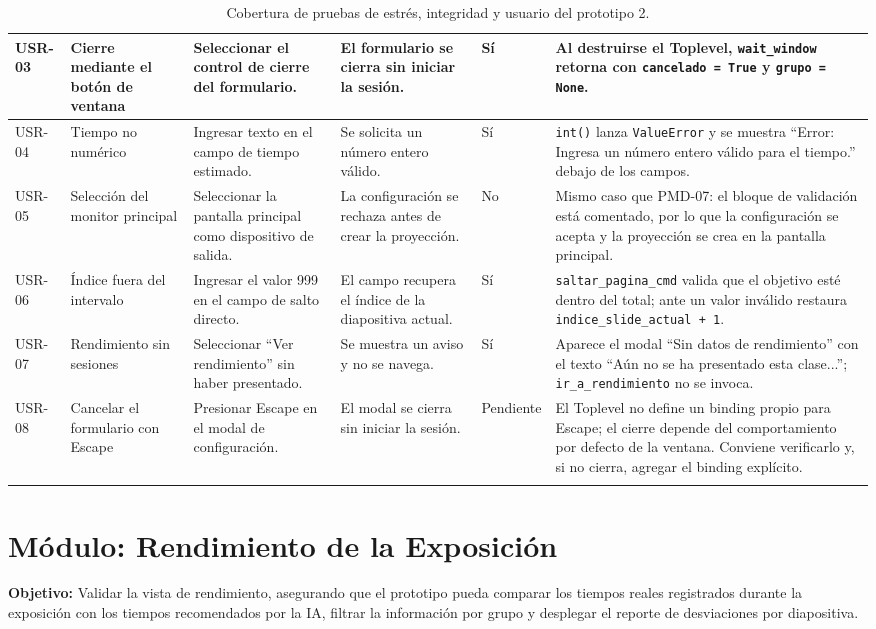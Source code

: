 \documentclass[12pt,letterpaper]{article}
\begin{document}
{\begin{longtable}{|L{1.1cm}|L{2.3cm}|L{3.2cm}|L{3.6cm}|L{1.2cm}|L{3.6cm}|}
USR-03 & Cierre mediante el botón de ventana & Seleccionar el control de cierre del formulario. & El formulario se cierra sin iniciar la sesión. & Sí & Al destruirse el Toplevel, \texttt{wait\_window} retorna con \texttt{cancelado = True} y \texttt{grupo = None}. \\ \hline
USR-04 & Tiempo no numérico & Ingresar texto en el campo de tiempo estimado. & Se solicita un número entero válido. & Sí & \texttt{int()} lanza \texttt{ValueError} y se muestra ``Error: Ingresa un número entero válido para el tiempo.'' debajo de los campos. \\ \hline
USR-05 & Selección del monitor principal & Seleccionar la pantalla principal como dispositivo de salida. & La configuración se rechaza antes de crear la proyección. & No & Mismo caso que PMD-07: el bloque de validación está comentado, por lo que la configuración se acepta y la proyección se crea en la pantalla principal. \\ \hline
USR-06 & Índice fuera del intervalo & Ingresar el valor 999 en el campo de salto directo. & El campo recupera el índice de la diapositiva actual. & Sí & \texttt{saltar\_pagina\_cmd} valida que el objetivo esté dentro del total; ante un valor inválido restaura \texttt{indice\_slide\_actual + 1}. \\ \hline
USR-07 & Rendimiento sin sesiones & Seleccionar ``Ver rendimiento'' sin haber presentado. & Se muestra un aviso y no se navega. & Sí & Aparece el modal ``Sin datos de rendimiento'' con el texto ``Aún no se ha presentado esta clase...''; \texttt{ir\_a\_rendimiento} no se invoca. \\ \hline
USR-08 & Cancelar el formulario con Escape & Presionar Escape en el modal de configuración. & El modal se cierra sin iniciar la sesión. & Pendiente & El Toplevel no define un binding propio para Escape; el cierre depende del comportamiento por defecto de la ventana. Conviene verificarlo y, si no cierra, agregar el binding explícito. \\ \hline
\caption{Cobertura de pruebas de estrés, integridad y usuario del prototipo 2.}
\label{tab:cobertura-estres-prototipo-2}
\end{longtable}
}

\clearpage
\section*{Módulo: Rendimiento de la Exposición}

\textbf{Objetivo:} Validar la vista de rendimiento, asegurando que el prototipo pueda comparar los tiempos reales registrados durante la exposición con los tiempos recomendados por la IA, filtrar la información por grupo y desplegar el reporte de desviaciones por diapositiva.
\end{document}
